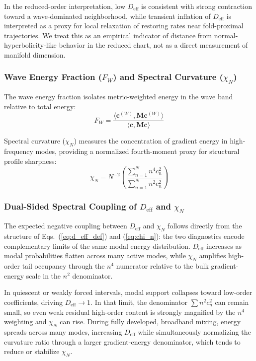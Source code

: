 In the reduced-order interpretation, low $D_{\mathrm{eff}}$ is consistent with strong contraction toward a wave-dominated neighborhood, while transient inflation of $D_{\mathrm{eff}}$ is interpreted as a proxy for local relaxation of restoring rates near fold-proximal trajectories. We treat this as an empirical indicator of distance from normal-hyperbolicity-like behavior in the reduced chart, not as a direct measurement of manifold dimension.

\subsubsection{Wave Energy Fraction (\texorpdfstring{$F_W$}{FW}) and Spectral Curvature (\texorpdfstring{$\chi_N$}{ChiN})}

The wave energy fraction isolates metric-weighted energy in the wave band relative to total energy:
\begin{equation}
F_W = \frac{\langle \mathbf{c}^{(W)}, \mathbf{M} \mathbf{c}^{(W)} \rangle}{\langle \mathbf{c}, \mathbf{M} \mathbf{c} \rangle}
\label{eq:f_w}
\end{equation}

Spectral curvature ($\chi_N$) measures the concentration of gradient energy in high-frequency modes, providing a normalized fourth-moment proxy for structural profile sharpness:
\begin{equation}
\chi_N = N^{-2} \left( \frac{\sum_{n=1}^{N} n^4 c_n^2}{\sum_{n=1}^{N} n^2 c_n^2} \right)
\label{eq:chi_n}
\end{equation}

\subsubsection{Dual-Sided Spectral Coupling of \texorpdfstring{$D_{\mathrm{eff}}$}{Deff} and \texorpdfstring{$\chi_N$}{ChiN}}
The expected negative coupling between $D_{\mathrm{eff}}$ and $\chi_N$ follows directly from the structure of Eqs.~(\ref{eq:d_eff_def}) and (\ref{eq:chi_n}): the two diagnostics encode complementary limits of the same modal energy distribution. $D_{\mathrm{eff}}$ increases as modal probabilities flatten across many active modes, while $\chi_N$ amplifies high-order tail occupancy through the $n^4$ numerator relative to the bulk gradient-energy scale in the $n^2$ denominator.

In quiescent or weakly forced intervals, modal support collapses toward low-order coefficients, driving $D_{\mathrm{eff}} \to 1$. In that limit, the denominator $\sum n^2 c_n^2$ can remain small, so even weak residual high-order content is strongly magnified by the $n^4$ weighting and $\chi_N$ can rise. During fully developed, broadband mixing, energy spreads across many modes, increasing $D_{\mathrm{eff}}$ while simultaneously normalizing the curvature ratio through a larger gradient-energy denominator, which tends to reduce or stabilize $\chi_N$.

